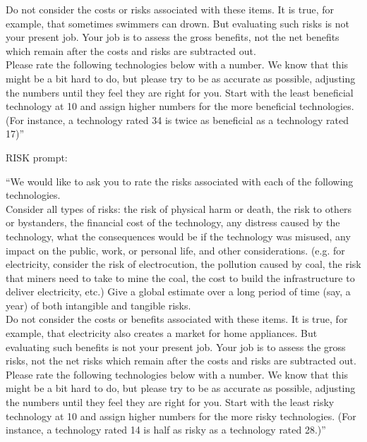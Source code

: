 \documentclass{acm_proc_article-sp}
\begin{document}
Do not consider the costs or risks associated with these items. It is true, for example, that sometimes swimmers can drown. But evaluating such risks is not your present job. Your job is to assess the gross benefits, not the net benefits which remain after the costs and risks are subtracted out. \\[-.6cm]

Please rate the following technologies below with a number. We know that this might be a bit hard to do, but please try to be as accurate as possible, adjusting the numbers until they feel they are right for you. Start with the least beneficial technology at 10 and assign higher numbers for the more beneficial technologies. (For instance, a technology rated 34 is twice as beneficial as a technology rated 17)''

RISK prompt:

``We would like to ask you to rate the risks associated with each of the following technologies. \\[-.6cm]

Consider all types of risks: the risk of physical harm or death, the risk to others or bystanders, the financial cost of the technology, any distress caused by the technology, what the consequences would be if the technology was misused, any impact on the public, work, or personal life, and other considerations. (e.g. for electricity, consider the risk of electrocution, the pollution caused by coal, the risk that miners need to take to mine the coal, the cost to build the infrastructure to deliver electricity, etc.) Give a global estimate over a long period of time (say, a year) of both intangible and tangible risks. \\[-.6cm]

Do not consider the costs or benefits associated with these items. It is true, for example, that electricity also creates a market for home appliances. But evaluating such benefits is not your present job. Your job is to assess the gross risks, not the net risks which remain after the costs and risks are subtracted out.\\[-.6cm]

Please rate the following technologies below with a number. We know that this might be a bit hard to do, but please try to be as accurate as possible, adjusting the numbers until they feel they are right for you. Start with the least risky technology at 10 and assign higher numbers for the more risky technologies. (For instance, a technology rated 14 is half as risky as a technology rated 28.)''
\end{document}
